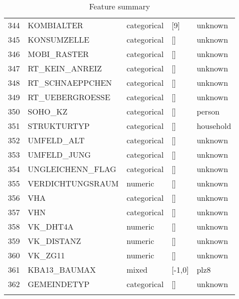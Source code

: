 \begin{longtable}{lllll}
344 &   KOMBIALTER &  categorical &    [9] &   unknown \\
345 &  KONSUMZELLE &  categorical &     [] &   unknown \\
346 &  MOBI\_RASTER &  categorical &     [] &   unknown \\
347 &   RT\_KEIN\_ANREIZ &  categorical &     [] &   unknown \\
348 &  RT\_SCHNAEPPCHEN &  categorical &     [] &   unknown \\
349 &  RT\_UEBERGROESSE &  categorical &     [] &   unknown \\
350 &   SOHO\_KZ &  categorical &     [] &    person \\
351 &  STRUKTURTYP &  categorical &     [] & household \\
352 &   UMFELD\_ALT &  categorical &     [] &   unknown \\
353 &  UMFELD\_JUNG &  categorical &     [] &   unknown \\
354 & UNGLEICHENN\_FLAG &  categorical &     [] &   unknown \\
355 & VERDICHTUNGSRAUM &  numeric &     [] &   unknown \\
356 &   VHA &  categorical &     [] &   unknown \\
357 &   VHN &  categorical &     [] &   unknown \\
358 &  VK\_DHT4A &  numeric &     [] &   unknown \\
359 &   VK\_DISTANZ &  numeric &     [] &   unknown \\
360 &   VK\_ZG11 &  numeric &     [] &   unknown \\
361 &     KBA13\_BAUMAX &    mixed & [-1,0] &  plz8 \\
362 &  GEMEINDETYP &  categorical &     [] &   unknown \\
\caption{Feature summary}
\label{tab:FEAT_INFO} \\
\end{longtable}
